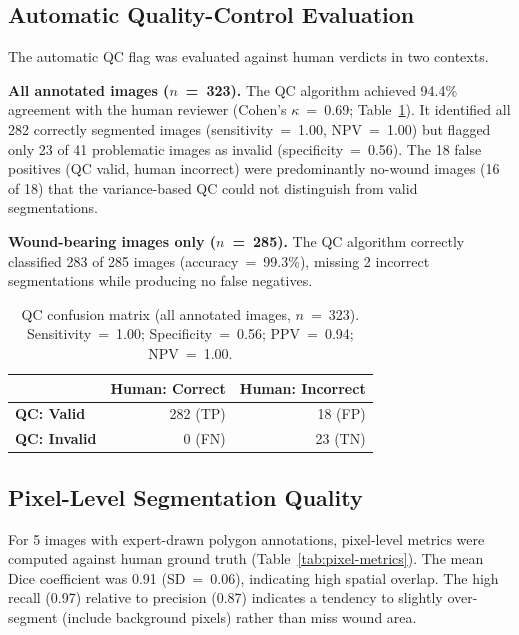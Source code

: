 \subsection{Automatic Quality-Control Evaluation}

The automatic QC flag was evaluated against human verdicts in two contexts.

\textbf{All annotated images ($n$~=~323).}
The QC algorithm achieved 94.4\% agreement with the human reviewer (Cohen's $\kappa$~=~0.69;
Table~\ref{tab:qc-confusion}).
It identified all 282 correctly segmented images (sensitivity~=~1.00, NPV~=~1.00) but
flagged only 23 of 41 problematic images as invalid (specificity~=~0.56).
The 18 false positives (QC valid, human incorrect) were predominantly no-wound images
(16 of 18) that the variance-based QC could not distinguish from valid segmentations.

\textbf{Wound-bearing images only ($n$~=~285).}
The QC algorithm correctly classified 283 of 285 images (accuracy~=~99.3\%),
missing 2 incorrect segmentations while producing no false negatives.

\begin{table}[htbp]
\centering
\caption{QC confusion matrix (all annotated images, $n$~=~323).
  Sensitivity~=~1.00; Specificity~=~0.56; PPV~=~0.94; NPV~=~1.00.}
\label{tab:qc-confusion}
\begin{tabular}{lrr}
\toprule
 & Human: Correct & Human: Incorrect \\
\midrule
\textbf{QC: Valid}   & 282 (TP) & 18 (FP) \\
\textbf{QC: Invalid} & 0 (FN)   & 23 (TN) \\
\bottomrule
\end{tabular}
\end{table}

\subsection{Pixel-Level Segmentation Quality}

For 5 images with expert-drawn polygon annotations, pixel-level metrics were computed against
human ground truth (Table~\ref{tab:pixel-metrics}).
The mean Dice coefficient was 0.91 (SD~=~0.06), indicating high spatial overlap.
The high recall (0.97) relative to precision (0.87) indicates a tendency to slightly
over-segment (include background pixels) rather than miss wound area.

